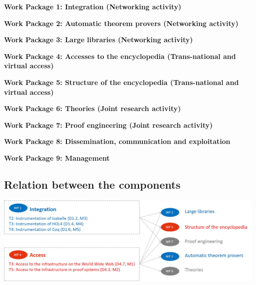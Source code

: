 \begin{workplan}


  \newcommand\na{(Networking activity)}
  \newcommand\tnva{(Trans-national and virtual access)}
  \newcommand\jra{(Joint research activity)}
  \newcommand\titlewp[3]{\bigskip\noindent\colorbox{color3}{\begin{minipage}\textwidth\bf Work Package #1: #2\end{minipage}}}

\titlewp{1}{Integration \na}{instrumentation}

\titlewp{2}{Automatic theorem provers \na}{atpetc}

\titlewp{3}{Large libraries \na}{libraries}

\titlewp{4}{Accesses to the encyclopedia \tnva}{access}

\titlewp{5}{Structure of the encyclopedia \tnva}{structuring}

\titlewp{6}{Theories \jra}{theories}

\titlewp{7}{Proof engineering \jra}{alignment}

\titlewp{8}{Dissemination, communication and exploitation}{dissemination}

\titlewp{9}{Management}{management}

\end{workplan}



\subsection{Relation between the components}

\includegraphics[width=\textwidth]{PERT}




